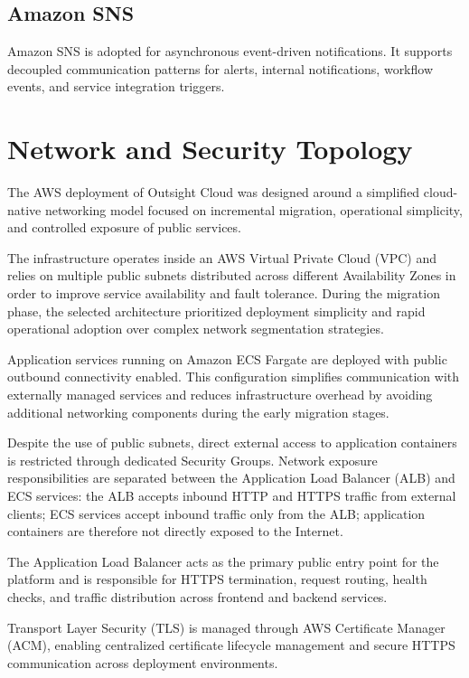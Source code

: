 \subsection{Amazon SNS}
Amazon SNS is adopted for asynchronous event-driven notifications. It supports decoupled communication patterns for alerts, internal notifications, workflow events, and service integration triggers.

\section{Network and Security Topology}
The AWS deployment of Outsight Cloud was designed around a simplified cloud-native networking model focused on incremental migration, operational simplicity, and controlled exposure of public services.

The infrastructure operates inside an AWS Virtual Private Cloud (VPC) and relies on multiple public subnets distributed across different Availability Zones in order to improve service availability and fault tolerance. During the migration phase, the selected architecture prioritized deployment simplicity and rapid operational adoption over complex network segmentation strategies.

Application services running on Amazon ECS Fargate are deployed with public outbound connectivity enabled. This configuration simplifies communication with externally managed services and reduces infrastructure overhead by avoiding additional networking components during the early migration stages.

Despite the use of public subnets, direct external access to application containers is restricted through dedicated Security Groups. Network exposure responsibilities are separated between the Application Load Balancer (ALB) and ECS services: the ALB accepts inbound HTTP and HTTPS traffic from external clients; ECS services accept inbound traffic only from the ALB; application containers are therefore not directly exposed to the Internet.

The Application Load Balancer acts as the primary public entry point for the platform and is responsible for HTTPS termination, request routing, health checks, and traffic distribution across frontend and backend services.

Transport Layer Security (TLS) is managed through AWS Certificate Manager (ACM), enabling centralized certificate lifecycle management and secure HTTPS communication across deployment environments.

